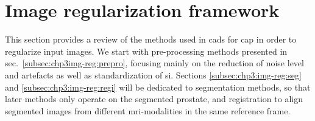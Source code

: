 \section{Image regularization framework}\label{sec:chp3:img-reg}

This section provides a review of the methods used in \acp{cad} for \ac{cap} in order to regularize input images.
We start with pre-processing methods presented in \acs{sec}.~\ref{subsec:chp3img-reg:prepro}, focusing mainly on the reduction of noise level and artefacts as well as standardization of \ac{si}.
Sections \ref{subsec:chp3:img-reg:seg} and \ref{subsec:chp3:img-reg:regi} will be dedicated to segmentation methods, so that later methods only operate on the segmented prostate, and registration to align segmented images from different \ac{mri}-modalities in the same reference frame.





